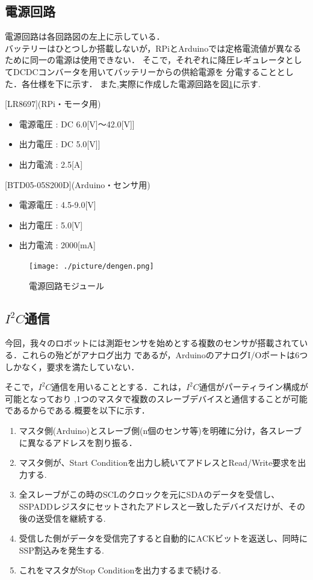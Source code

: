 \documentclass[10pt,a4j]{ujarticle}
\begin{document}
\subsection{電源回路}
電源回路は各回路図の左上に示している．\\
バッテリーはひとつしか搭載しないが，RPiとArduinoでは定格電流値が異なるために同一の電源は使用できない．
そこで，それぞれに降圧レギュレータとしてDCDCコンバータを用いてバッテリーからの供給電源を
分電することとした．各仕様を下に示す．
また,実際に作成した電源回路を図\ref{dengen}に示す.

[LR8697](RPi・モータ用)
\begin{itemize}
 \item 電源電圧 : DC 6.0[V]$〜$42.0[V]]
 \item 出力電圧 : DC 5.0[V]]
 \item 出力電流 : 2.5[A]
\end{itemize}

[BTD05-05S200D](Arduino・センサ用)
\begin{itemize}
 \item 電源電圧 : 4.5-9.0[V]
 \item 出力電圧 : 5.0[V]
 \item 出力電流 : 2000[mA]
\end{itemize}
\begin{figure}[t]
 \centering
 \texttt{[image: ./picture/dengen.png]}
    \caption{電源回路モジュール}
    \label{dengen}
\end{figure}
\newpage
\subsection{$I^2 C$通信}
今回，我々のロボットには測距センサを始めとする複数のセンサが搭載されている．これらの殆どがアナログ出力
であるが，ArduinoのアナログI/Oポートは6つしかなく，要求を満たしていない．

そこで，$I^2 C$通信を用いることとする．これは，$I^2 C$通信がパーティライン構成が可能となっており
,1つのマスタで複数のスレーブデバイスと通信することが可能であるからである.概要を以下に示す．
\begin{enumerate}
 \item マスタ側(Arduino)とスレーブ側(n個のセンサ等)を明確に分け，各スレーブに異なるアドレスを割り振る．
 \item マスタ側が、Start Conditionを出力し続いてアドレスとRead/Write要求を出力する.
 \item 全スレーブがこの時のSCLのクロックを元にSDAのデータを受信し、SSPADDレジスタにセットされたアドレスと一致したデバイスだけが、その後の送受信を継続する.
 \item 受信した側がデータを受信完了すると自動的にACKビットを返送し、同時にSSP割込みを発生する.
 \item これをマスタがStop Conditionを出力するまで続ける.
\end{enumerate}
\end{document}
